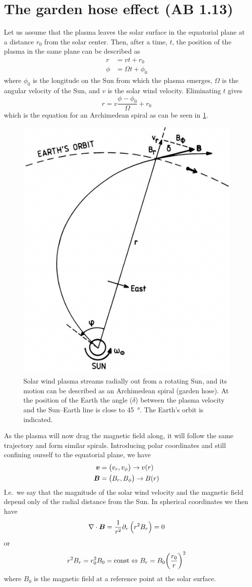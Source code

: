 \section[The garden hose effect]{The garden hose effect (AB 1.13)}
Let us assume that the plasma leaves the solar surface in the equatorial plane at a distance \(r_0\) from the solar center. Then, after a time, \(t\), the position of the plasma in the same plane can be described as
\begin{align*}
    r&=vt+r_0\\
    \phi&=\Omega t+\phi_0
\end{align*}
where \(\phi_0\) is the longitude on the Sun from which the plasma emerges, \(\Omega \) is the angular velocity of the Sun, and \(v\) is the solar wind velocity. Eliminating \(t\) gives
\begin{equation*}
    r=v\frac{\phi-\phi_0}{\Omega}+r_0
\end{equation*}
which is the equation for an Archimedean spiral as can be seen in \cref{fig:L9_garden_hose}.
\begin{figure}[t]
    \centering
    \includegraphics[width=.4\linewidth]{bilder/L9_garden_hose.png}
    \caption{Solar wind plasma streams radially out from a rotating Sun, and its motion can be described as an Archimedean spiral (garden hose). At the position of the Earth the angle (\(\delta \)) between the plasma velocity and the Sun–Earth line is close to \SI{45}{\degree}. The Earth’s orbit is indicated.}\label{fig:L9_garden_hose}
\end{figure}

As the plasma will now drag the magnetic field along, it will follow the same trajectory and form similar spirals. Introducing polar coordinates and still confining ourself to the equatorial plane, we have
\begin{align*}
    \boldsymbol{v}&=\left(v_r,v_\phi\right)\rightarrow v(r)\\
    \boldsymbol{B}&=\left(B_r,B_\phi\right)\rightarrow B(r)
\end{align*}
I.e.\ we say that the magnitude of the solar wind velocity and the magnetic field depend only of the radial distance from the Sun. In spherical coordinates we then have
\begin{equation*}
    \nabla\cdot\boldsymbol{B}=\frac{1}{r^2}\partial_{r}\left(r^2B_r\right)=0
\end{equation*}
or \begin{equation*}
    r^2B_r=r_0^2B_0=\textnormal{const} \Leftrightarrow B_r=B_0{\left(\frac{r_0}{r}\right)}^2
\end{equation*}
where \(B_0\) is the magnetic field at a reference point at the solar surface.

